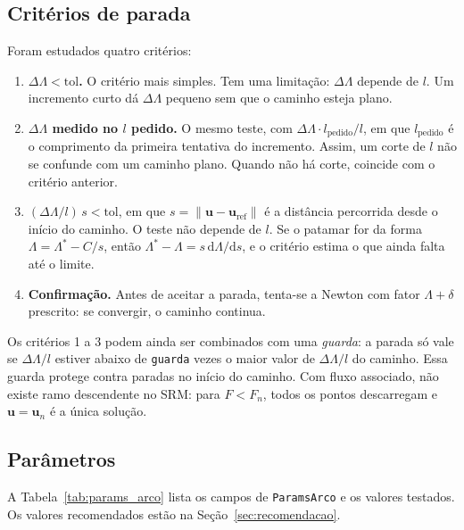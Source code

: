 \documentclass[11pt,a4paper]{article}
\numberwithin{equation}{section}
\begin{document}
\subsection{Critérios de parada}\label{sec:parada}

Foram estudados quatro critérios:
\begin{enumerate}
\item \textbf{$\Delta\Lambda < \mathrm{tol}$.} O critério mais simples. Tem uma limitação: $\Delta\Lambda$ depende de $l$. Um incremento curto dá $\Delta\Lambda$ pequeno sem que o caminho esteja plano.
\item \textbf{$\Delta\Lambda$ medido no $l$ pedido.} O mesmo teste, com $\Delta\Lambda\cdot l_{\mathrm{pedido}}/l$, em que $l_{\mathrm{pedido}}$ é o comprimento da primeira tentativa do incremento. Assim, um corte de $l$ não se confunde com um caminho plano. Quando não há corte, coincide com o critério anterior.
\item \textbf{$(\Delta\Lambda/l)\,s < \mathrm{tol}$}, em que $s = \|\mathbf{u}-\mathbf{u}_{\mathrm{ref}}\|$ é a distância percorrida desde o início do caminho. O teste não depende de $l$. Se o patamar for da forma $\Lambda = \Lambda^{*} - C/s$, então $\Lambda^{*}-\Lambda = s\,\mathrm{d}\Lambda/\mathrm{d}s$, e o critério estima o que ainda falta até o limite.
\item \textbf{Confirmação.} Antes de aceitar a parada, tenta-se a Newton com fator $\Lambda+\delta$ prescrito: se convergir, o caminho continua.
\end{enumerate}
Os critérios 1 a 3 podem ainda ser combinados com uma \emph{guarda}: a parada só vale se $\Delta\Lambda/l$ estiver abaixo de \texttt{guarda} vezes o maior valor de $\Delta\Lambda/l$ do caminho. Essa guarda protege contra paradas no início do caminho. Com fluxo associado, não existe ramo descendente no SRM: para $F < F_n$, todos os pontos descarregam e $\mathbf{u}=\mathbf{u}_n$ é a única solução.

\subsection{Parâmetros}

A Tabela~\ref{tab:params_arco} lista os campos de \texttt{ParamsArco} e os valores testados. Os valores recomendados estão na Seção~\ref{sec:recomendacao}.
\end{document}

